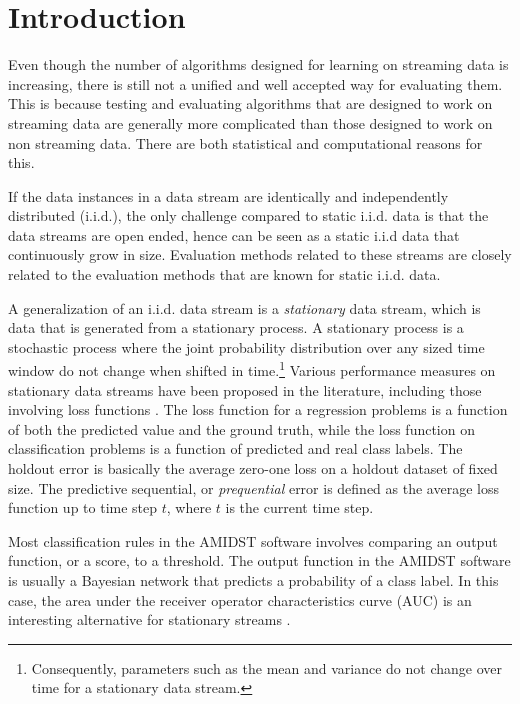 \section{Introduction}

Even though the number of algorithms designed for learning on streaming data is increasing, there is still not a unified and well accepted way for evaluating them.  This is because testing and evaluating algorithms that are designed to work on streaming data are generally more complicated than those designed to work on non streaming data.  There are both statistical and computational reasons for this.  

If the data instances in a data stream are identically and independently distributed (i.i.d.),  the only challenge compared to static i.i.d. data is that the data streams are open ended, hence can be seen as a static i.i.d data that continuously grow in size.  Evaluation methods related to these streams are closely related to the evaluation methods that are known for static i.i.d. data.  

A generalization of an i.i.d. data stream is a \textit{stationary} data stream, which is data that is generated from a stationary process. A stationary process is a stochastic process where the joint probability distribution over any sized time window do not change when shifted in time.\footnote{Consequently, parameters such as the mean and variance do not change over time for a stationary data stream.}
%
Various performance measures on stationary data streams have been proposed in the literature, including those involving loss functions  \cite{Gam09,Gam09_2,Gam13}.  
The loss function for a regression problems is a function of both the predicted value and the ground truth, while the loss function on classification problems is a function of predicted and real class labels.  
The holdout error is basically the average zero-one loss on a holdout dataset of fixed size.  
The predictive sequential, or \emph{prequential} error is defined as the average loss function up to time step $t$, where $t$ is the current time step. 

Most classification rules in the AMIDST software involves comparing an output function, or a score, to a threshold.  The output function in the AMIDST software is usually a Bayesian network that predicts a probability of a class label.  In this case, the area under the receiver operator characteristics curve (AUC) is an interesting alternative for stationary streams \cite{Dit13, Hoe12, Lic10}.

